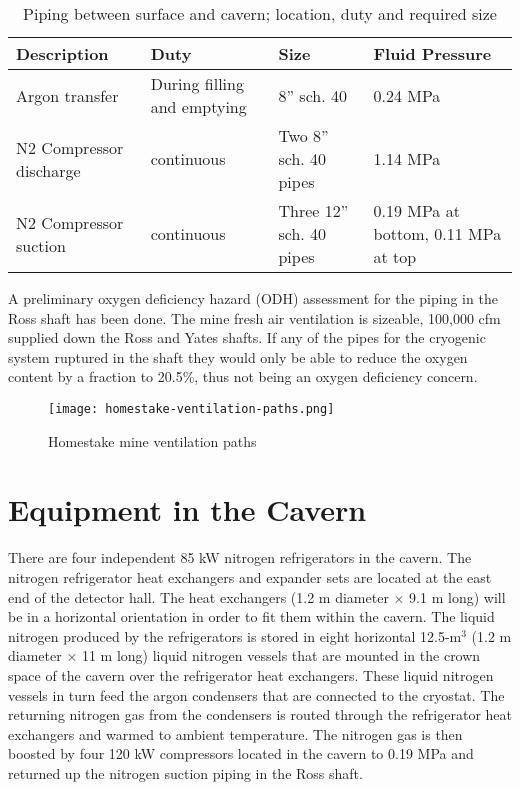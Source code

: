 \begin{table}
\caption{Piping between surface and cavern; location, duty and required size}
\label{table:pipelines}
\begin{tabular}[htbp]{|p{}|p{}|p{}|p{}|}
\hline
\textbf{Description} & \textbf{Duty} & \textbf{Size} & \textbf{Fluid Pressure} \\
\hline
Argon transfer & During filling and emptying & 8'' sch. 40 &  0.24 MPa\\
\hline
N2 Compressor discharge & continuous & Two 8'' sch. 40 pipes & 1.14 MPa \\
\hline
N2 Compressor suction & continuous & Three 12'' sch. 40 pipes &  0.19 MPa at bottom, 0.11 MPa at top \\
\hline\end{tabular} 
\end{table}

A preliminary oxygen deficiency hazard (ODH) assessment for the piping in the Ross shaft has
been done. The mine fresh air ventilation is sizeable, 100,000 cfm supplied down the Ross and
Yates shafts. If any of the pipes for the cryogenic system ruptured in the shaft they would only
be able to reduce the oxygen content by a fraction to 20.5\%, thus not being an oxygen
deficiency concern.

\begin{figure}[htbp]
\centering
\texttt{[image: homestake-ventilation-paths.png]} 
\caption{Homestake mine ventilation paths}
\label{fig:ventilation-paths}
\end{figure}


\section{Equipment in the Cavern}

There are four independent 85 kW nitrogen refrigerators in the cavern. The nitrogen
refrigerator heat exchangers and expander sets are located at the east end of the detector hall.
The heat exchangers (1.2 m diameter $\times$ 9.1 m long) will be in a horizontal orientation in order to
fit them within the cavern. The liquid nitrogen produced by the refrigerators is stored in
eight horizontal 12.5-m$^3$ (1.2 m diameter $\times$ 11 m long) liquid nitrogen vessels that are mounted in the
crown space of the cavern over the refrigerator heat exchangers. These liquid nitrogen vessels
in turn feed the argon condensers that are connected to the cryostat. The returning nitrogen
gas from the condensers is routed through the refrigerator heat exchangers and warmed to
ambient temperature. The nitrogen gas is then boosted by four 120 kW compressors located in
the cavern to 0.19 MPa and returned up the nitrogen suction piping in the Ross shaft.

